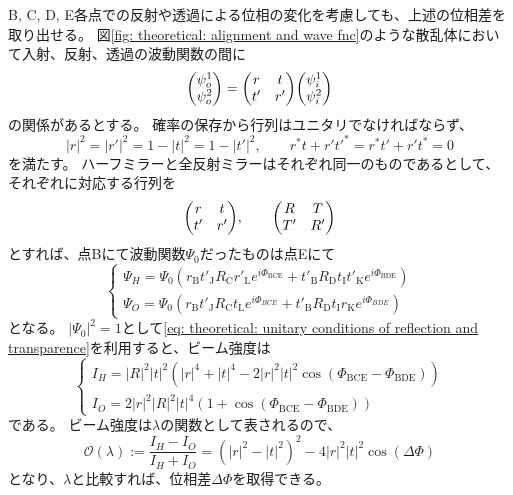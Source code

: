 \documentclass[dvipdfmx]{jsarticle}
\begin{document}
B, C, D, E各点での反射や透過による位相の変化を考慮しても、上述の位相差を取り出せる。
図\ref{fig: theoretical: alignment and wave fnc}のような散乱体において入射、反射、透過の波動関数の間に
\begin{equation*}
    \mqty(\psi_o^1\\\psi_o^2)
    =
    \mqty(r & t \\ t' & r')
    \mqty(\psi_i^1\\\psi_i^2)
\end{equation*}
の関係があるとする。
確率の保存から行列はユニタリでなければならず、
\begin{equation}
    \label{eq: theoretical: unitary conditions of reflection and transparence}
    |r|^2
    =
    |r'|^2
    =
    1-|t|^2
    =
    1-|t'|^2
    ,\qquad
    r^\ast t+r't'^\ast
    =
    r^\ast t'+r't^\ast
    =0
\end{equation}
を満たす。
ハーフミラーと全反射ミラーはそれぞれ同一のものであるとして、それぞれに対応する行列を
\begin{equation*}
    \mqty(r & t \\ t' & r')
    ,\qquad
    \mqty(R & T \\ T' & R')
\end{equation*}
とすれば、点Bにて波動関数$\Psi_0$だったものは点Eにて
\begin{equation*}
    \begin{cases}
        \Psi_H
        =
        \Psi_0
        (
            r_\mathrm{B}t'_\mathrm{J}R_\mathrm{C}r'_\mathrm{L}
            e^{i\Phi_\mathrm{BCE}}
            +
            t'_\mathrm{B}R_\mathrm{D}t_\mathrm{I}t'_\mathrm{K}
            e^{i\Phi_\mathrm{BDE}}
        )
        \\
        \Psi_O
        =
        \Psi_0
        (
            r_\mathrm{B}t'_\mathrm{J}R_\mathrm{C}t_\mathrm{L}
            e^{i\Phi_{BCE}}
            +
            t'_\mathrm{B}R_\mathrm{D}t_\mathrm{I}r_\mathrm{K}
            e^{i\Phi_{BDE}}
        )
    \end{cases}
\end{equation*}
となる。
$|\Psi_0|^2=1$として\eqref{eq: theoretical: unitary conditions of reflection and transparence}を利用すると、ビーム強度は
\begin{equation*}
    \begin{cases}
        I_H
        =
        |R|^2|t|^2
        (
            |r|^4
            +|t|^4
            -2|r|^2|t|^2\cos(\Phi_\mathrm{BCE}-\Phi_\mathrm{BDE})
        )
        \\
        I_O
        =
        2|r|^2|R|^2|t|^4
        (1+\cos(\Phi_\mathrm{BCE}-\Phi_\mathrm{BDE}))
    \end{cases}
\end{equation*}
である。
ビーム強度は$\lambda$の関数として表されるので、
\begin{equation}
    \label{eq: theoretical: oscillation lambda}
    \mathscr{O}(\lambda)
    :=
    \frac{I_H-I_O}{I_H+I_O}
    =
    (|r|^2-|t|^2)^2-4|r|^2|t|^2\cos(\Delta\Phi)
\end{equation}
となり、$\lambda$と比較すれば、位相差$\Delta\Phi$を取得できる。
\end{document}
